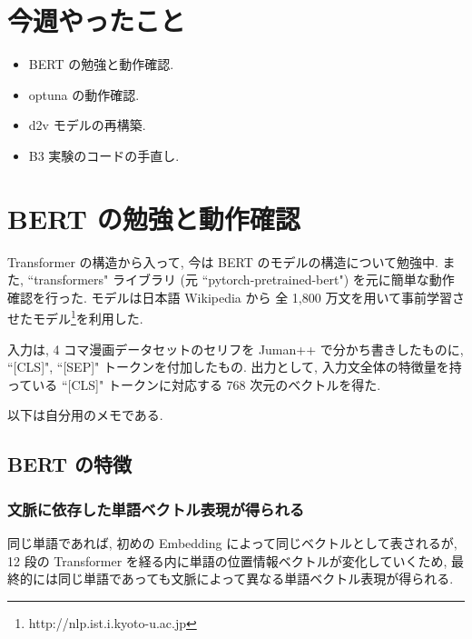 \documentclass[twocolumn]{jarticle}     %
\begin{document}

\section{今週やったこと}

\begin{itemize}
  \item BERT\cite{BERT} の勉強と動作確認.
  \item optuna の動作確認.
  \item d2v モデルの再構築.
  \item B3 実験のコードの手直し.
\end{itemize}

\section{BERT の勉強と動作確認}
Transformer の構造から入って, 今は BERT のモデルの構造について勉強中.
また, ``transformers" ライブラリ (元 ``pytorch-pretrained-bert") を元に簡単な動作確認を行った.
モデルは日本語 Wikipedia から 全 1,800 万文を用いて事前学習させたモデル\footnote{http://nlp.ist.i.kyoto-u.ac.jp}を利用した.

入力は, 4 コマ漫画データセットのセリフを Juman++ で分かち書きしたものに, ``[CLS]", ``[SEP]" トークンを付加したもの. 出力として, 入力文全体の特徴量を持っている ``[CLS]" トークンに対応する $768$ 次元のベクトルを得た.

以下は自分用のメモである.

\subsection{BERT の特徴}
\subsubsection{文脈に依存した単語ベクトル表現が得られる}
同じ単語であれば, 初めの Embedding によって同じベクトルとして表されるが, 12 段の Transformer を経る内に単語の位置情報ベクトルが変化していくため, 最終的には同じ単語であっても文脈によって異なる単語ベクトル表現が得られる.
\end{document}
